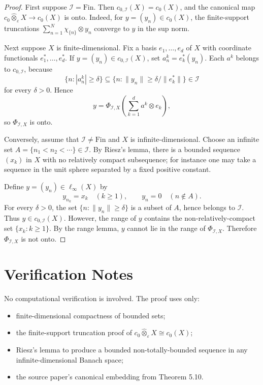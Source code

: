 \documentclass[11pt]{article}
\newcommand{\Fin}{\mathrm{Fin}}
\newcommand{\eps}{\varepsilon}
\begin{document}
\begin{proof}
First suppose \(\mathcal I=\Fin\).  Then \(c_{0,\mathcal I}(X)=c_0(X)\), and
the canonical map \(c_0\hat\otimes_\eps X\to c_0(X)\) is onto.  Indeed, for
\(y=(y_n)\in c_0(X)\), the finite-support truncations
\(\sum_{n=1}^N \chi_{\{n\}}\otimes y_n\) converge to \(y\) in the sup norm.

Next suppose \(X\) is finite-dimensional.  Fix a basis \(e_1,\ldots,e_d\) of
\(X\) with coordinate functionals \(e_1^*,\ldots,e_d^*\).  If
\(y=(y_n)\in c_{0,\mathcal I}(X)\), set \(a^k_n=e_k^*(y_n)\).  Each
\(a^k\) belongs to \(c_{0,\mathcal I}\), because
\[
  \{n: |a^k_n|\geq\delta\}
  \subseteq
  \{n:\|y_n\|\geq \delta/\|e_k^*\|\}\in\mathcal I
\]
for every \(\delta>0\).  Hence
\[
  y=\Phi_{\mathcal I,X}\left(\sum_{k=1}^d a^k\otimes e_k\right),
\]
so \(\Phi_{\mathcal I,X}\) is onto.

Conversely, assume that \(\mathcal I\ne\Fin\) and \(X\) is infinite-dimensional.
Choose an infinite set \(A=\{n_1<n_2<\cdots\}\in\mathcal I\).  By Riesz's
lemma, there is a bounded sequence \((x_k)\) in \(X\) with no relatively compact
subsequence; for instance one may take a sequence in the unit sphere separated
by a fixed positive constant.

Define \(y=(y_n)\in\ell_\infty(X)\) by
\[
  y_{n_k}=x_k\quad(k\geq1),
  \qquad
  y_n=0\quad(n\notin A).
\]
For every \(\delta>0\), the set \(\{n:\|y_n\|\geq\delta\}\) is a subset of
\(A\), hence belongs to \(\mathcal I\).  Thus \(y\in c_{0,\mathcal I}(X)\).
However, the range of \(y\) contains the non-relatively-compact set
\(\{x_k:k\geq1\}\).  By the range lemma, \(y\) cannot lie in the range of
\(\Phi_{\mathcal I,X}\).  Therefore \(\Phi_{\mathcal I,X}\) is not onto.
\end{proof}

\section*{Verification Notes}

No computational verification is involved.  The proof uses only:
\begin{itemize}
\item finite-dimensional compactness of bounded sets;
\item the finite-support truncation proof of
\(c_0\hat\otimes_\eps X\cong c_0(X)\);
\item Riesz's lemma to produce a bounded non-totally-bounded sequence in any
infinite-dimensional Banach space;
\item the source paper's canonical embedding from Theorem 5.10.
\end{itemize}
\end{document}
